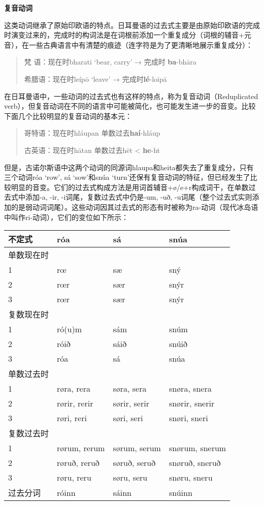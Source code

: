 \textbf{复音动词}

这类动词继承了原始印欧语的特点。日耳曼语的过去式主要是由原始印欧语的完成时演变过来的，完成时的构词法是在词根前添加一个重复成分（词根的辅音+元音），在一些古典语言中有清楚的痕迹（连字符是为了更清晰地展示重复成分）：

\begin{quote}
梵 语：现在时bharati `bear, carry' → 完成时 \textbf{ba}-bhāra

希腊语：现在时leípō `leave' → 完成时\textbf{lé}-loipā
\end{quote}

在日耳曼语中，一些动词的过去式也有这样的特点，称为复音动词（Reduplicated
verb），但复音动词在不同的语言中可能被简化，也可能发生进一步的音变。比较下面几个比较明显的复音动词的基本元：

\begin{quote}
哥特语：现在时hláupan 单数过去\textbf{haí}-hláup

古英语：现在时hātan 单数过去hēt \textless{} \textbf{he}-ht
\end{quote}

但是，古诺尔斯语中这两个动词的同源词hlaupa和heita都失去了重复成分，只有三个动词róa
`row‌', sá `sow‌'和snúa
`turn‌'还保有复音动词的特征，但已经发生了比较明显的音变。它们的过去式构成方法是用词首辅音+ø/e+r构成词干，在单数过去式中添加-a,
-ir, -i词尾，复数过去式中仍是-um, -uð,
-u词尾（整个过去式实则添加的是弱动词词尾）。这些动词因其过去式的形态有时被称为ra-动词（现代冰岛语中叫作ri-动词），它们的变位如下所示：

\begin{longtable}{llll}
\toprule
不定式 & róa & sá & snúa \\
\midrule
\endhead
\bottomrule
\endfoot
单数现在时 & & & \\
1 & rœ & sæ & sný \\
2 & rœr & sær & snýr \\
3 & rœr & sær & snýr \\
复数现在时 & & & \\
1 & ró(u)m & sám & snúm \\
2 & róið & sáið & snúið \\
3 & róa & sá & snúa \\
单数过去时 & & & \\
1 & røra, rera & søra, sera & snøra, snera \\
2 & rørir, rerir & sørir, serir & snørir, snerir \\
3 & røri, reri & søri, seri & snøri, sneri \\
复数过去时 & & & \\
1 & rørum, rerum & sørum, serum & snørum, snerum \\
2 & røruð, reruð & søruð, seruð & snøruð, sneruð \\
3 & røru, reru & søru, seru & snøru, sneru \\
过去分词 & róinn & sáinn & snúinn \\
\end{longtable}

